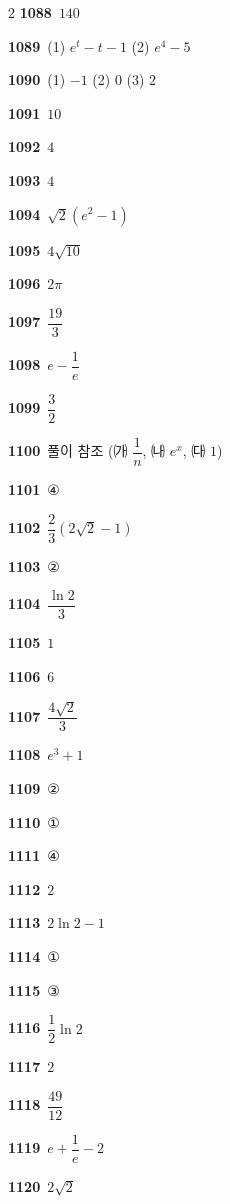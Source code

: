 \documentclass[10pt,a4paper]{article}
\begin{document}
\begin{multicols}{2}
\noindent\textbf{1088}\ $140$\par
\noindent\textbf{1089}\ (1) $e^t-t-1$ \quad (2) $e^4-5$\par
\noindent\textbf{1090}\ (1) $-1$ \quad (2) $0$ \quad (3) $2$\par
\noindent\textbf{1091}\ $10$\par
\noindent\textbf{1092}\ $4$\par
\noindent\textbf{1093}\ $4$\par
\noindent\textbf{1094}\ $\sqrt{2}(e^2-1)$\par
\noindent\textbf{1095}\ $4\sqrt{10}$\par
\noindent\textbf{1096}\ $2\pi$\par
\noindent\textbf{1097}\ $\dfrac{19}{3}$\par
\noindent\textbf{1098}\ $e-\dfrac{1}{e}$\par
\noindent\textbf{1099}\ $\dfrac{3}{2}$\par
\noindent\textbf{1100}\ 풀이 참조 (㈎ $\dfrac{1}{n}$, ㈏ $e^x$, ㈐ $1$)\par
\noindent\textbf{1101}\ ④\par
\noindent\textbf{1102}\ $\dfrac{2}{3}(2\sqrt{2}-1)$\par
\noindent\textbf{1103}\ ②\par
\noindent\textbf{1104}\ $\dfrac{\ln 2}{3}$\par
\noindent\textbf{1105}\ $1$\par
\noindent\textbf{1106}\ $6$\par
\noindent\textbf{1107}\ $\dfrac{4\sqrt{2}}{3}$\par
\noindent\textbf{1108}\ $e^3+1$\par
\noindent\textbf{1109}\ ②\par
\noindent\textbf{1110}\ ①\par
\noindent\textbf{1111}\ ④\par
\noindent\textbf{1112}\ $2$\par
\noindent\textbf{1113}\ $2\ln 2-1$\par
\noindent\textbf{1114}\ ①\par
\noindent\textbf{1115}\ ③\par
\noindent\textbf{1116}\ $\dfrac{1}{2}\ln 2$\par
\noindent\textbf{1117}\ $2$\par
\noindent\textbf{1118}\ $\dfrac{49}{12}$\par
\noindent\textbf{1119}\ $e+\dfrac{1}{e}-2$\par
\noindent\textbf{1120}\ $2\sqrt{2}$\par

\end{multicols}
\end{document}

